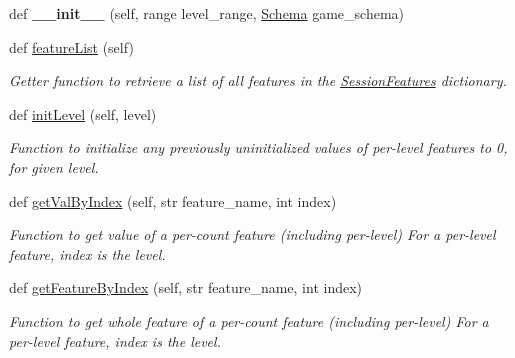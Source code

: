 \begin{DoxyCompactItemize}
\item 
\mbox{\label{classfeature__extractors_1_1_extractor_1_1_extractor_1_1_session_features_ae6ae2a1040d474fda7bee2a3e8f5e91d}} 
def {\bfseries \+\_\+\+\_\+init\+\_\+\+\_\+} (self, range level\+\_\+range, \mbox{\hyperlink{classschemas_1_1_schema_1_1_schema}{Schema}} game\+\_\+schema)
\item 
def \mbox{\hyperlink{classfeature__extractors_1_1_extractor_1_1_extractor_1_1_session_features_a5e4db04ec6f3c1359823f8ece468f955}{feature\+List}} (self)
\begin{DoxyCompactList}\small\item\em Getter function to retrieve a list of all features in the \mbox{\hyperlink{classfeature__extractors_1_1_extractor_1_1_extractor_1_1_session_features}{Session\+Features}} dictionary. \end{DoxyCompactList}\item 
def \mbox{\hyperlink{classfeature__extractors_1_1_extractor_1_1_extractor_1_1_session_features_a47d153676bf4b32b9d7d686b34378090}{init\+Level}} (self, level)
\begin{DoxyCompactList}\small\item\em Function to initialize any previously uninitialized values of per-\/level features to 0, for given level. \end{DoxyCompactList}\item 
def \mbox{\hyperlink{classfeature__extractors_1_1_extractor_1_1_extractor_1_1_session_features_a239bd49dfe33736f8c76edccfa7a50b2}{get\+Val\+By\+Index}} (self, str feature\+\_\+name, int index)
\begin{DoxyCompactList}\small\item\em Function to get value of a per-\/count feature (including per-\/level) For a per-\/level feature, index is the level. \end{DoxyCompactList}\item 
def \mbox{\hyperlink{classfeature__extractors_1_1_extractor_1_1_extractor_1_1_session_features_a661173b55a36766ad239d447e9bbcf4b}{get\+Feature\+By\+Index}} (self, str feature\+\_\+name, int index)
\begin{DoxyCompactList}\small\item\em Function to get whole feature of a per-\/count feature (including per-\/level) For a per-\/level feature, index is the level. \end{DoxyCompactList}\item 

\end{DoxyCompactItemize}
